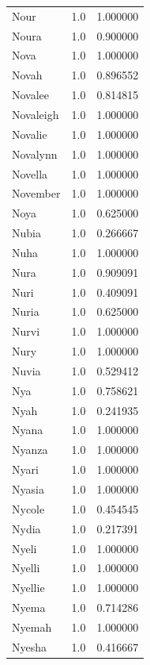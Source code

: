 \documentclass[
  letterpaper,
  DIV=11,
  numbers=noendperiod]{scrreprt}
\begin{document}
\begin{tabular}{lrr}
Nour            &   1.0 &   1.000000 \\
Noura           &   1.0 &   0.900000 \\
Nova            &   1.0 &   1.000000 \\
Novah           &   1.0 &   0.896552 \\
Novalee         &   1.0 &   0.814815 \\
Novaleigh       &   1.0 &   1.000000 \\
Novalie         &   1.0 &   1.000000 \\
Novalynn        &   1.0 &   1.000000 \\
Novella         &   1.0 &   1.000000 \\
November        &   1.0 &   1.000000 \\
Noya            &   1.0 &   0.625000 \\
Nubia           &   1.0 &   0.266667 \\
Nuha            &   1.0 &   1.000000 \\
Nura            &   1.0 &   0.909091 \\
Nuri            &   1.0 &   0.409091 \\
Nuria           &   1.0 &   0.625000 \\
Nurvi           &   1.0 &   1.000000 \\
Nury            &   1.0 &   1.000000 \\
Nuvia           &   1.0 &   0.529412 \\
Nya             &   1.0 &   0.758621 \\
Nyah            &   1.0 &   0.241935 \\
Nyana           &   1.0 &   1.000000 \\
Nyanza          &   1.0 &   1.000000 \\
Nyari           &   1.0 &   1.000000 \\
Nyasia          &   1.0 &   1.000000 \\
Nycole          &   1.0 &   0.454545 \\
Nydia           &   1.0 &   0.217391 \\
Nyeli           &   1.0 &   1.000000 \\
Nyelli          &   1.0 &   1.000000 \\
Nyellie         &   1.0 &   1.000000 \\
Nyema           &   1.0 &   0.714286 \\
Nyemah          &   1.0 &   1.000000 \\
Nyesha          &   1.0 &   0.416667 \\

\end{tabular}
\end{document}
